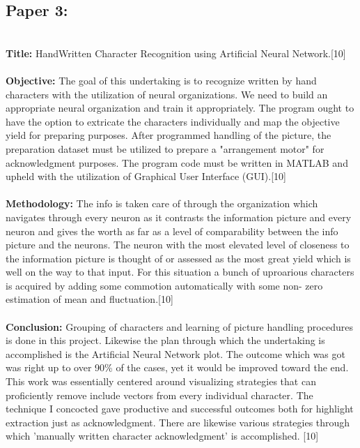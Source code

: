 \documentclass[12pt, conference]{IEEEtran}
\begin{document}
\subsection{\textbf{Paper 3:}}
\textbf{}\\
\textbf{Title:} HandWritten Character Recognition using Artificial Neural Network.[10]\\
\textbf{}\\
\textbf{Objective:} The goal of this undertaking is to recognize written by hand characters with the utilization of neural organizations. We need to build an appropriate neural organization and train it appropriately. The program ought to have the option to extricate the characters individually and map the objective yield for preparing purposes. After programmed handling of the picture, the preparation dataset must be utilized to prepare a "arrangement motor" for acknowledgment purposes. The program code must be written in MATLAB and upheld with the utilization of Graphical User Interface (GUI).[10]\\
\textbf{}\\
\textbf{Methodology:} The info is taken care of through the organization which navigates through every neuron as it contrasts the information picture and every neuron and gives the worth as far as a level of comparability between the info picture and the neurons. The neuron with the most elevated level of closeness to the information picture is thought of or assessed as the most great yield which is well on the way to that input. For this situation a bunch of uproarious characters is acquired by adding some commotion automatically with some non- zero estimation of mean and fluctuation.[10]\\
\textbf{}\\
\textbf{Conclusion:} Grouping of characters and learning of picture handling procedures is done in this project. Likewise the plan through which the undertaking is accomplished is the Artificial Neural Network plot. The outcome which was got was right up to over 90\% of the cases, yet it would be improved toward the end. This work was essentially centered around visualizing strategies that can proficiently remove include vectors from every individual character. The technique I concocted gave productive and successful outcomes both for highlight extraction just as acknowledgment. There are likewise various strategies through which 'manually written character acknowledgment' is accomplished. [10]

\textbf{}\\
\end{document}

